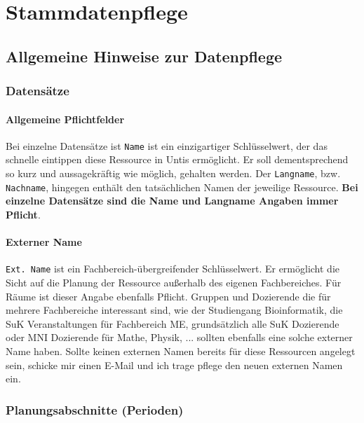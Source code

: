 
\chapter{Stammdatenpflege}
\label{chap:data}

\section{Allgemeine Hinweise zur Datenpflege}

\subsection{Datensätze}

\subsubsection{Allgemeine Pflichtfelder}

Bei einzelne Datensätze ist \texttt{Name} ist ein einzigartiger Schlüsselwert, der das schnelle eintippen diese Ressource in Untis ermöglicht. Er soll dementsprechend so kurz und aussagekräftig wie möglich, gehalten werden. Der \texttt{Langname}, bzw. \texttt{Nachname}, hingegen enthält den tatsächlichen Namen der jeweilige Ressource. \textbf{Bei einzelne Datensätze sind die Name und Langname Angaben immer Pflicht}.\\

\subsubsection{Externer Name}
\label{sec:ext-name}

\texttt{Ext. Name} ist ein Fachbereich-übergreifender Schlüsselwert. Er ermöglicht die Sicht auf die Planung der Ressource außerhalb des eigenen Fachbereiches. Für Räume ist dieser Angabe ebenfalls Pflicht. Gruppen und Dozierende die für mehrere Fachbereiche interessant sind, wie der Studiengang Bioinformatik, die SuK Veranstaltungen für Fachbereich ME, grundsätzlich alle SuK Dozierende oder MNI Dozierende für Mathe, Physik, ... sollten ebenfalls eine solche externer Name haben. Sollte keinen externen Namen bereits für diese Ressourcen angelegt sein, schicke mir einen E-Mail und ich trage pflege den neuen externen Namen ein.


\subsection{Planungsabschnitte (Perioden)}

